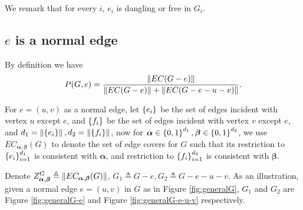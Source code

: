 We remark that for every $i$, $e_i$ is dangling or free in $G_i$.

\subsection{$e$ is a normal edge}
By definition we have
\begin{equation}
	P(G,e) = \frac{\left\Vert EC(G-e)\right\Vert}{\left\Vert EC(G-e)\right\Vert + \left\Vert EC(G-e-u-v)\right\Vert }.
\end{equation}


	For $e=(u,v)$ as a normal edge, let $\left\{e_i\right\}$ be the set of edges incident with vertex $u$ except $e$, and $\left\{f_i\right\}$ be the set of edges incident with vertex $v$ except $e$, and $d_1 = \left\Vert\left\{e_i\right\}\right\Vert, d_2 = \left\Vert\left\{f_i\right\}\right\Vert$, now for $\boldsymbol\alpha \in \left\{0,1\right\}^{d_1}, \boldsymbol\beta \in \left\{0,1\right\}^{d_2}$, we use $EC_{\boldsymbol\alpha,\boldsymbol\beta}(G)$ to denote the set of edge covers for $G$ such that its restriction to $\left\{e_i\right\}_{i=1}^{d_1}$ is consistent with $\boldsymbol\alpha$, and restriction to $\left\{f_i\right\}_{i=1}^{d_2}$ is consistent with $\boldsymbol\beta$.

	Denote $Z_{\boldsymbol\alpha, \boldsymbol\beta}^G \triangleq \left\Vert EC_{\boldsymbol\alpha, \boldsymbol\beta}(G)\right\Vert$, $G_1 \triangleq G-e, G_2 \triangleq G-e-u-v$. As an illustration, given a normal edge $e=(u,v)$ in $G$ as in Figure \ref{fig:generalG}, $G_1$ and $G_2$ are Figure \ref{fig:generalG-e} and Figure \ref{fig:generalG-e-u-v} respectively.

